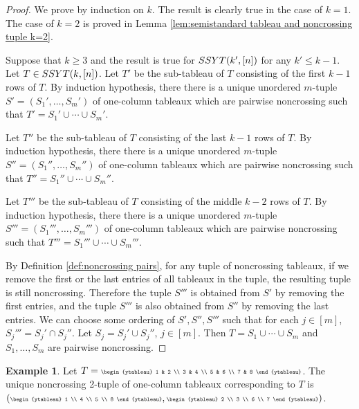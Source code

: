 \documentclass[12pt, reqno]{amsart}
\theoremstyle{plain}
\theoremstyle{definition}
\newtheorem{example}[theorem]{Example}
\numberwithin{equation}{section}
\newcommand{\SSYT}{{\rm SSYT}}
\newcommand\scalemath[2]{\scalebox{#1}{\mbox{\ensuremath{\displaystyle #2}}}}
\begin{document}
\begin{proof}
We prove by induction on $k$. The result is clearly true in the case of $k=1$. The case of $k=2$ is proved in Lemma \ref{lem:semistandard tableau and noncrossing tuple k=2}. 

Suppose that $k \ge 3$ and the result is true for $\SSYT(k', [n])$ for any $k' \le k-1$. Let $T \in {\rm SSYT}(k, [n])$. Let $T'$ be the sub-tableau of $T$ consisting of the first $k-1$ rows of $T$. By induction hypothesis, there there is a unique unordered $m$-tuple $S'=(S_1', \ldots, S_m')$ of one-column tableaux which are pairwise noncrossing such that $T' = S_1' \cup \cdots \cup S_m'$.  

Let $T''$ be the sub-tableau of $T$ consisting of the last $k-1$ rows of $T$. By induction hypothesis, there there is a unique unordered $m$-tuple $S''=(S_1'', \ldots, S_m'')$ of one-column tableaux which are pairwise noncrossing such that $T'' = S_1'' \cup \cdots \cup S_m''$.  

Let $T'''$ be the sub-tableau of $T$ consisting of the middle $k-2$ rows of $T$. By induction hypothesis, there there is a unique unordered $m$-tuple $S'''=(S_1''', \ldots, S_m''')$ of one-column tableaux which are pairwise noncrossing such that $T''' = S_1''' \cup \cdots \cup S_m'''$.

By Definition \ref{def:noncrossing pairs}, for any tuple of noncrossing tableaux, if we remove the first or the last entries of all tableaux in the tuple, the resulting tuple is still noncrossing. Therefore the tuple $S'''$ is obtained from $S'$ by removing the first entries, and the tuple $S'''$ is also obtained from $S''$ by removing the last entries. We can choose some ordering of $S', S'', S'''$ such that for each $j \in [m]$, $S_{j}'''=S_{j}' \cap S_{j}''$. Let $S_j = S_{j}' \cup S_{j}''$, $j \in [m]$. Then $T=S_1 \cup \cdots \cup S_m$ and $S_1, \ldots, S_m$ are pairwise noncrossing. 
\end{proof}

\begin{example}
Let $T= \scalemath{0.6}{ \begin{ytableau} 1 & 2 \\ 3 & 4 \\ 5 & 6 \\ 7 & 8 \end{ytableau}}$. The unique noncrossing 2-tuple of one-column tableaux corresponding to $T$ is $( \scalemath{0.6}{ \begin{ytableau} 1 \\ 4 \\ 5 \\ 8 \end{ytableau}}, \scalemath{0.6}{ \begin{ytableau} 2 \\ 3 \\ 6 \\ 7 \end{ytableau} } )$. 
\end{example}
\end{document}
